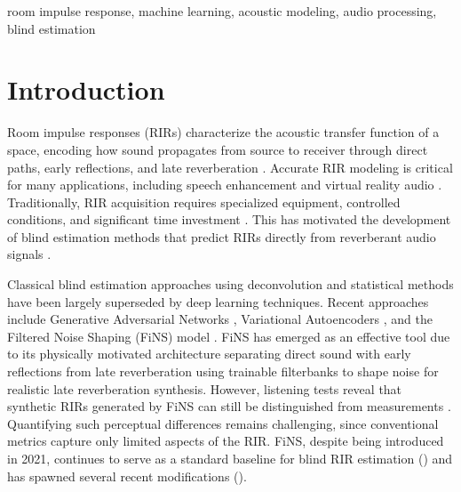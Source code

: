\documentclass[conference]{IEEEtran}
\begin{document}
\begin{IEEEkeywords}
room impulse response, machine learning, acoustic modeling, audio processing, blind estimation
\end{IEEEkeywords}
 
\section{Introduction}
 
Room impulse responses (RIRs) characterize the acoustic transfer function of a space, encoding how sound propagates from source to receiver through direct paths, early reflections, and late reverberation \cite{kuttruff2016room}. Accurate RIR modeling is critical for many applications, including speech enhancement \cite{ratnarajah2023towards} and virtual reality audio \cite{lee2023yet}. Traditionally, RIR acquisition requires specialized equipment, controlled conditions, and significant time investment \cite{szoke2019building}. This has motivated the development of blind estimation methods that predict RIRs directly from reverberant audio signals \cite{steinmetz2021filtered, ratnarajah2023towards, lee2023yet, lee2023RIRmultiple, Lin2024deeproomimpulseresponse, lin2006bayesian, crammer2006room}. 
 
Classical blind estimation approaches using deconvolution and statistical methods \cite{lin2006bayesian, crammer2006room} have been largely superseded by deep learning techniques. Recent approaches include Generative Adversarial Networks \cite{ratnarajah2023towards}, Variational Autoencoders \cite{lee2023yet}, and the Filtered Noise Shaping (FiNS) model \cite{steinmetz2021filtered}. FiNS has emerged as an effective tool due to its physically motivated architecture separating direct sound with early reflections from late reverberation using trainable filterbanks to shape noise for realistic late reverberation synthesis. However, listening tests reveal that synthetic RIRs generated by FiNS can still be distinguished from measurements \cite{steinmetz2021filtered}. Quantifying such perceptual differences remains challenging, since conventional metrics capture only limited aspects of the RIR. FiNS, despite being introduced in 2021, continues to serve as a standard baseline for blind RIR estimation (\cite{ratnarajah2023towards, saini2024EDC, lee2023yet}) and has spawned several recent modifications (\cite{Lin2024deeproomimpulseresponse, lee2023RIRmultiple}). 
 
\end{document}
